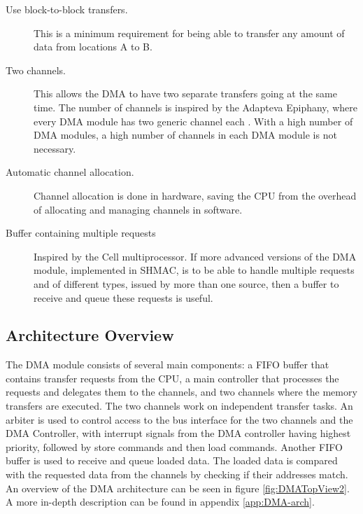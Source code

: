 \begin{description}
	\item[Use block-to-block transfers.] This is a minimum requirement for being
	able to transfer any amount of data from locations A to B.
	\item[Two channels.] This allows the DMA to have two separate transfers going
	at the same time.
	The number of channels is inspired by the Adapteva Epiphany, where every DMA module has two generic channel each \cite{epiphany}.
	With a high number of DMA modules, a high number of channels in each DMA module is not necessary.
	\item[Automatic channel allocation.] Channel allocation is done in hardware,
	saving the CPU from the overhead of allocating and managing channels in software.
	\item[Buffer containing multiple requests] Inspired by the Cell multiprocessor.
	If more advanced versions of the DMA module, implemented in SHMAC, is to be able to handle multiple requests and of different types, issued by more than one source, then a buffer to receive and queue these requests is useful.
\end{description}

\subsection{Architecture Overview}

The DMA module consists of several main components: a FIFO buffer that contains transfer requests from the CPU, a main controller that processes the requests and delegates them to the channels, and two channels where the memory transfers are executed.
The two channels work on independent transfer tasks.
An arbiter is used to control access to the bus interface for the two channels and the DMA Controller, with interrupt signals from the DMA controller having highest priority, followed by store commands and then load commands.
Another FIFO buffer is used to receive and queue loaded data.
The loaded data is compared with the requested data from the channels by checking if their addresses match. 
An overview of the DMA architecture can be seen in figure \ref{fig:DMATopView2}. A more in-depth description
can be found in appendix \ref{app:DMA-arch}.

